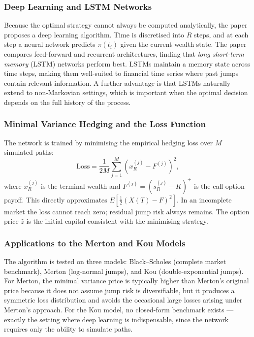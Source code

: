 \documentclass[12pt,a4paper]{article}
\begin{document}
\subsubsection*{Deep Learning and LSTM Networks}

Because the optimal strategy cannot always be computed analytically, the paper proposes a deep learning algorithm. Time is discretised into $R$ steps, and at each step a neural network predicts $\pi(t_i)$ given the current wealth state. The paper compares feed-forward and recurrent architectures, finding that \textit{long short-term memory} (LSTM) networks perform best. LSTMs maintain a memory state across time steps, making them well-suited to financial time series where past jumps contain relevant information. A further advantage is that LSTMs naturally extend to non-Markovian settings, which is important when the optimal decision depends on the full history of the process.

\subsubsection*{Minimal Variance Hedging and the Loss Function}

The network is trained by minimising the empirical hedging loss over $M$ simulated paths:
\begin{equation}
    \text{Loss} = \frac{1}{2M} \sum_{j=1}^{M} \left(x_R^{(j)} - F^{(j)}\right)^2,
\end{equation}
where $x_R^{(j)}$ is the terminal wealth and $F^{(j)} = (s_R^{(j)} - K)^+$ is the call option payoff. This directly approximates $E\!\left[\frac{1}{2}(X(T)-F)^2\right]$. In an incomplete market the loss cannot reach zero; residual jump risk always remains. The option price $\hat{z}$ is the initial capital consistent with the minimising strategy.

\subsubsection*{Applications to the Merton and Kou Models}

The algorithm is tested on three models: Black--Scholes (complete market benchmark), Merton (log-normal jumps), and Kou (double-exponential jumps). For Merton, the minimal variance price is typically higher than Merton's original price because it does not assume jump risk is diversifiable, but it produces a symmetric loss distribution and avoids the occasional large losses arising under Merton's approach. For the Kou model, no closed-form benchmark exists --- exactly the setting where deep learning is indispensable, since the network requires only the ability to simulate paths.
\end{document}
